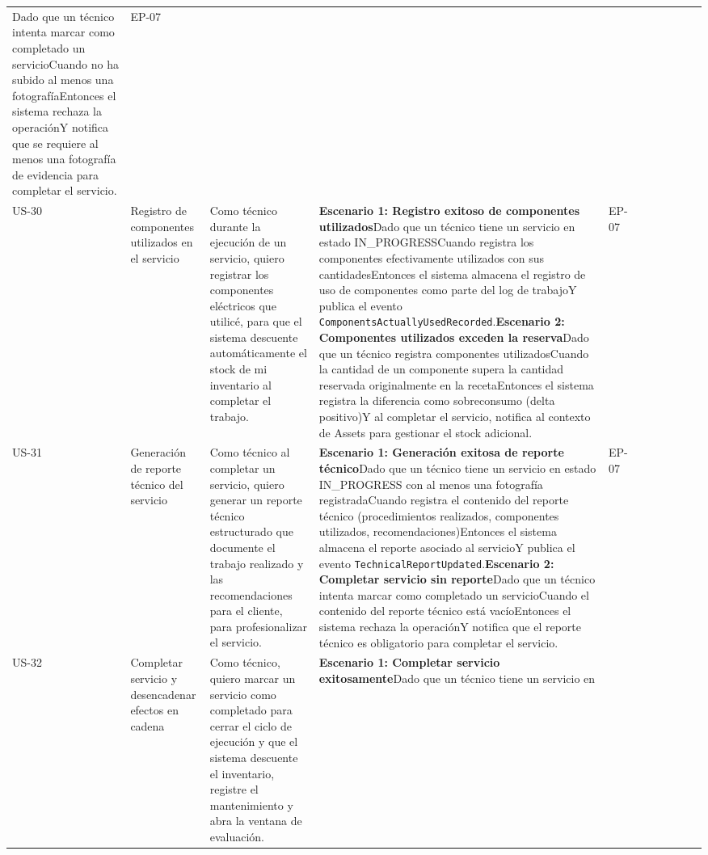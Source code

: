 {\begin{longtable}[]
{fotografías}Dado que un técnico intenta marcar como completado un
servicioCuando no ha subido al menos una fotografíaEntonces el sistema
rechaza la operaciónY notifica que se requiere al menos una fotografía
de evidencia para completar el servicio. & EP-07 \\
US-30 & Registro de componentes utilizados en el servicio & Como técnico
durante la ejecución de un servicio, quiero registrar los componentes
eléctricos que utilicé, para que el sistema descuente automáticamente el
stock de mi inventario al completar el trabajo. & \textbf{Escenario 1:
Registro exitoso de componentes utilizados}Dado que un técnico tiene un
servicio en estado IN\_PROGRESSCuando registra los componentes
efectivamente utilizados con sus cantidadesEntonces el sistema almacena
el registro de uso de componentes como parte del log de trabajoY publica
el evento \texttt{ComponentsActuallyUsedRecorded}.\textbf{Escenario 2:
Componentes utilizados exceden la reserva}Dado que un técnico registra
componentes utilizadosCuando la cantidad de un componente supera la
cantidad reservada originalmente en la recetaEntonces el sistema
registra la diferencia como sobreconsumo (delta positivo)Y al completar
el servicio, notifica al contexto de Assets para gestionar el stock
adicional. & EP-07 \\
US-31 & Generación de reporte técnico del servicio & Como técnico al
completar un servicio, quiero generar un reporte técnico estructurado
que documente el trabajo realizado y las recomendaciones para el
cliente, para profesionalizar el servicio. & \textbf{Escenario 1:
Generación exitosa de reporte técnico}Dado que un técnico tiene un
servicio en estado IN\_PROGRESS con al menos una fotografía
registradaCuando registra el contenido del reporte técnico
(procedimientos realizados, componentes utilizados,
recomendaciones)Entonces el sistema almacena el reporte asociado al
servicioY publica el evento
\texttt{TechnicalReportUpdated}.\textbf{Escenario 2: Completar servicio
sin reporte}Dado que un técnico intenta marcar como completado un
servicioCuando el contenido del reporte técnico está vacíoEntonces el
sistema rechaza la operaciónY notifica que el reporte técnico es
obligatorio para completar el servicio. & EP-07 \\
US-32 & Completar servicio y desencadenar efectos en cadena & Como
técnico, quiero marcar un servicio como completado para cerrar el ciclo
de ejecución y que el sistema descuente el inventario, registre el
mantenimiento y abra la ventana de evaluación. & \textbf{Escenario 1:
Completar servicio exitosamente}Dado que un técnico tiene un servicio en

\end{longtable}}
